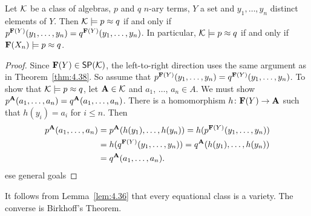 \documentclass[11pt]{amsart}  %
\begin{document}
\begin{corollary}
  \label{cor:4.39} 
Let $\mathcal{K}$ be a class of algebras, $p$ and $q$ $n$-ary terms, $Y$ a set 
and $y_1, \dots, y_n$ distinct elements of $Y$. Then $\mathcal{K} \models p \approx q$ 
if and only if 
$p^{\mathbf{F}(Y)}(y_1, \dots, y_n) = q^{\mathbf{F}(Y)}(y_1, \dots, y_n)$.
In particular, $\mathcal{K} \models p \approx q$ if and only if 
$\mathbf{F}(X_n)\models p \approx q$.
\end{corollary}
\begin{proof}
Since $\mathbf{F}(Y)\in \mathsf{S}\mathsf{P}(\mathcal{K})$, the left-to-right 
direction uses the same argument as in Theorem~\ref{thm:4.38}. So assume 
that 
$p^{\mathbf{F}(Y)}(y_1, \dots, y_n) = q^{\mathbf{F}(Y)}(y_1, \dots, y_n)$.
To show that $\mathcal{K} \models p \approx q$, let 
$\mathbf{A} \in \mathcal{K}$ and $a_1$, $\dots$, $a_n \in A$. 
We must show $p^{\mathbf{A}}(a_1, \dots, a_n) = q^{\mathbf{A}}(a_1, \dots, a_n)$. 
There is a homomorphism $h\colon \mathbf{F}(Y) \to \mathbf{A}$ 
such that $h(y_i) = a_i$ for $i \leq n$. Then
\begin{align*}
 p^{\mathbf{A}}(a_1, \dots, a_n) &= p^{\mathbf{A}}(h (y_1), \dots, h (y_n))
= h(p^{\mathbf{F}(Y)}(y_1, \dots, y_n))\\
&= h(q^{\mathbf{F}(Y)}(y_1, \dots, y_n))
= q^{\mathbf{A}}(h(y_1), \dots, h(y_n))\\
&= q^{\mathbf{A}}(a_1, \dots, a_n).
\end{align*}
ese general goals 
\end{proof}

It follows from Lemma~\ref{lem:4.36} that every equational class is a variety. 
The converse is Birkhoff's Theorem.
\end{document}
